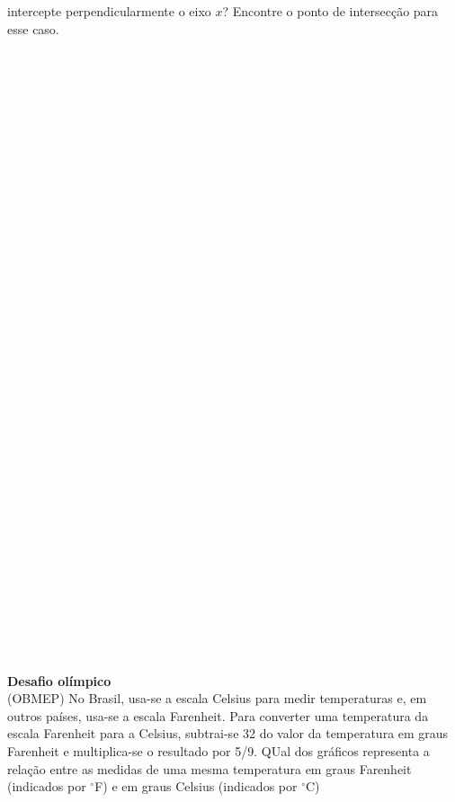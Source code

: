 \documentclass[a4paper,14pt]{article}
\begin{document}
\begin{multicols}{2}
\begin{enumerate}
        	intercepte perpendicularmente o eixo $x$? Encontre o ponto de intersecção para esse caso. \\\\\\\\\\\\\\\\\\\\\\\\\\\\\\\\\\\\\\\\\\\\\\\\\\\\\\\\\\\\\\\\\\\\\\\\\\
        	\textbf{Desafio olímpico}\\
        	(OBMEP) No Brasil, usa-se a escala Celsius para medir temperaturas e, em outros países, usa-se a escala Farenheit. Para converter uma temperatura da escala Farenheit para a Celsius, subtrai-se 32 do valor da temperatura em graus Farenheit e multiplica-se o resultado por 5/9. QUal dos gráficos representa a relação entre as medidas de uma mesma temperatura em graus Farenheit (indicados por $^\circ$F) e em graus Celsius (indicados por $^\circ$C)\\

\end{enumerate}
\end{multicols}
\end{document}

